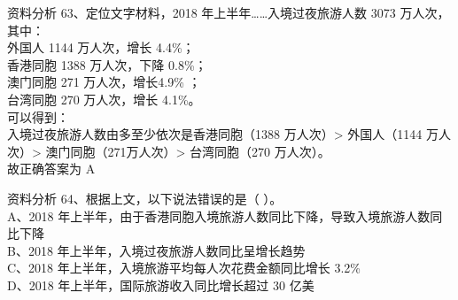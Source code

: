 \documentclass[aspectratio=169]{beamer}
\begin{document}
\begin{frame}[t]{资料分析}
    63、定位文字材料，2018 年上半年……入境过夜旅游人数 3073 万人次，其中：\\
    外国人 1144 万人次，增长 4.4\%；\\
    香港同胞 1388 万人次，下降 0.8\%；\\
    澳门同胞 271 万人次，增长4.9\% ；\\
    台湾同胞 270 万人次，增长 4.1\%。\\
    可以得到：\\
    入境过夜旅游人数由多至少依次是香港同胞（1388 万人次）> 外国人（1144 万人次）> 澳门同胞（271万人次）> 台湾同胞（270 万人次）。\\
    故正确答案为 A\\
\end{frame}                           


\begin{frame}[t]{资料分析}
    64、根据上文，以下说法错误的是（ ）。                                         \\
    A、2018 年上半年，由于香港同胞入境旅游人数同比下降，导致入境旅游人数同比下降  \\
    B、2018 年上半年，入境过夜旅游人数同比呈增长趋势                              \\
    C、2018 年上半年，入境旅游平均每人次花费金额同比增长 3.2\%                    \\
    D、2018 年上半年，国际旅游收入同比增长超过 30 亿美                            \\
\end{frame}                           
\end{document}
